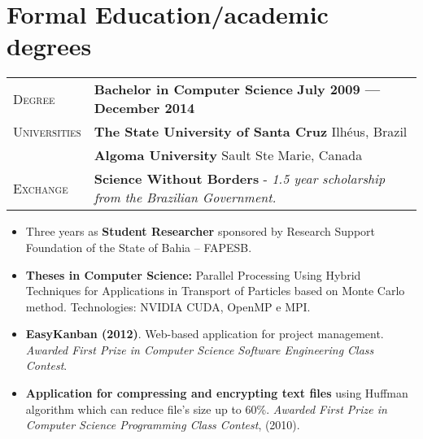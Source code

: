 \documentclass[10pt, a4paper, oneside, final]{scrartcl} %
\newcommand{\gray}{\rowcolor[gray]{.90}} %
\begin{document}


\section{Formal Education/academic degrees}

\begin{center}
\begin{tabularx}{1.0\linewidth}{>{\raggedleft\scshape}p{2.2cm}X}
\gray Degree & \textbf{Bachelor in Computer Science} \hfill \textbf{July 2009 --- December 2014}\\
\gray Universities & \textbf{The State University of Santa Cruz} \hfill Ilhéus, Brazil\\ 
\gray & \textbf{Algoma University} \hfill Sault Ste Marie, Canada\\
\gray Exchange & \textbf{Science Without Borders} - \textit{1.5 year scholarship from the Brazilian Government.}
\end{tabularx}
\end{center}

\begin{itemize}\itemsep1.0pt

\item Three years as \textbf{Student Researcher} sponsored by Research Support Foundation of the State of Bahia – FAPESB.

\item \textbf{Theses in Computer Science:} Parallel Processing Using Hybrid Techniques for Applications in Transport of Particles based on Monte Carlo method. Technologies: NVIDIA CUDA, OpenMP e MPI.
   
\item \textbf{EasyKanban (2012)}. Web-based application for project management. \textit{Awarded First Prize in Computer Science Software Engineering Class Contest}.
  
\item \textbf{Application for compressing and encrypting text files} using Huffman algorithm which can reduce file's size up to 60\%. \textit{Awarded First Prize in Computer Science Programming Class Contest}, (2010). 


  
\end{itemize}
\end{document}
